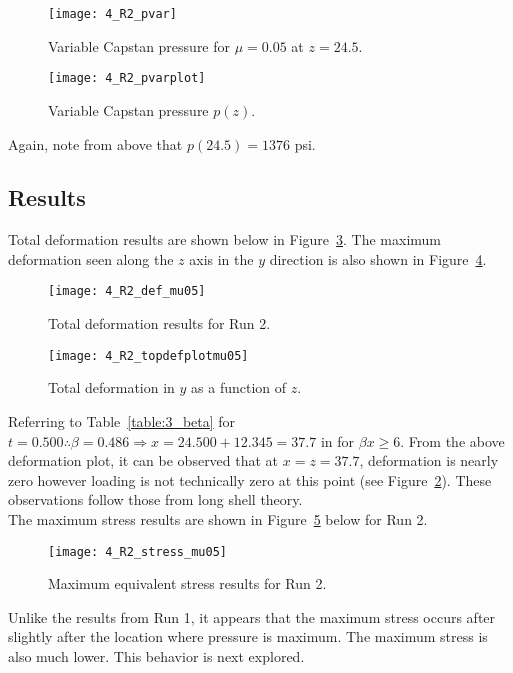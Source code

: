 \begin{figure}[H]
	\centering
	\texttt{[image: 4\_R2\_pvar]}
	\caption{Variable Capstan pressure for $\mu=0.05$ at $z=24.5$.}
	\label{fig:4_R2_pvar}
\end{figure}
\begin{figure}[H]
	\centering
	\texttt{[image: 4\_R2\_pvarplot]}
	\caption{Variable Capstan pressure $p(z)$.}
	\label{fig:4_R2_pvarplot}
\end{figure}

Again, note from above that $p(24.5)=1376$ psi.

\subsection{Results}

Total deformation results are shown below in Figure~\ref{fig:4_R2_def_mu05}. The maximum deformation seen along the $z$ axis in the $y$ direction is also shown in Figure~\ref{fig:4_R2_topdefplotmu05}.

\begin{figure}[H]
	\centering
 	\texttt{[image: 4\_R2\_def\_mu05]}
 	\caption{Total deformation results for Run 2.}
 	\label{fig:4_R2_def_mu05}
 \end{figure}
 
 \begin{figure}[H]
 	\centering
 \texttt{[image: 4\_R2\_topdefplotmu05]}
 	\caption{Total deformation in $y$ as a function of $z$.}
 	\label{fig:4_R2_topdefplotmu05}
 \end{figure}
 
Referring to Table~\ref{table:3_beta} for $t=0.500 \therefore \beta = 0.486 \Rightarrow x= 24.500+12.345 = 37.7$ in for $\beta x \geq 6$. From the above deformation plot, it can be observed that at $x=z=37.7$, deformation is nearly zero however loading is not technically zero at this point (see Figure~\ref{fig:4_R2_pvarplot}). These observations follow those from long shell theory.\\

The maximum stress results are shown in Figure~\ref{fig:4_R2_stress_mu05} below for Run 2.

\begin{figure}[H]
	\centering
	\texttt{[image: 4\_R2\_stress\_mu05]}
	\caption{Maximum equivalent stress results for Run 2.}
	\label{fig:4_R2_stress_mu05}
\end{figure}

Unlike the results from Run 1, it appears that the maximum stress occurs after slightly after the location where pressure is maximum. The maximum stress is also much lower. This behavior is next explored.

